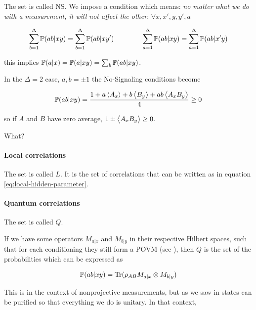 \documentclass[main.tex]{subfiles}
\begin{document}
The set is called NS.
We impose a condition which means: \emph{no matter what we do with a measurement, it will not affect the other}:
\(\forall x, x', y, y', a\)

\begin{equation}
    \sum_{b=1}^{\Delta} \P(ab|xy) = \sum_{b=1}^{\Delta} \P(ab|xy')
    \qquad \qquad
    \sum_{a=1}^{\Delta} \P(ab|xy) = \sum_{a=1}^{\Delta} \P(ab|x'y)
\end{equation}

this implies \(\P(a|x) = \P(a|xy) = \sum_b\P(ab|xy)\).

\begin{greenbox}
  In the \(\Delta=2\) case, \(a, b = \pm 1\) the No-Signaling conditions become

  \begin{equation}
      \P(ab|xy) = \frac{1 + a \expval{A_x} + b \expval{B_y} + ab \expval{A_x B_y}  }{4} \geq 0
  \end{equation}

  so if \(A\) and \(B\) have zero average, \(1 \pm \expval{A_x B_y} \geq 0 \).

  What?
\end{greenbox}

\paragraph{Local correlations}

The set is called \(L\).
It is the set of correlations that can be written as in equation \eqref{eq:local-hidden-parameter}.

\paragraph{Quantum correlations}

The set is called \(Q\).

If we have some operators \(M_{a|x}\) and \(M_{b|y}\) in their respective Hilbert spaces, such that for each conditioning they still form a POVM (see ), then \(Q\) is the set of the probabilities which can be expressed as

\begin{equation}
    \P(ab | xy) = \Tr (\rho_{AB} M_{a|x} \otimes M_{b|y})
\end{equation}

This is in the context of nonprojective measurements, but as we saw in  states can be purified so that everything we do is unitary. In that context,
\end{document}
